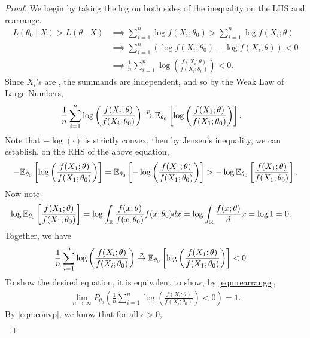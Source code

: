 \begin{proof}
We begin by taking the log on both sides of the inequality on the LHS and rearrange. 
\begin{align}
L(\theta_0 \mid X) > L(\theta \mid X) &\implies \sum_{i=1}^n \log f(X_i;\theta_0) > \sum_{i=1}^n \log f(X_i;\theta)\nonumber\\
&\implies \sum_{i=1}^n \left(\log f(X_i;\theta_0) - \log f(X_i;\theta)\right) < 0\nonumber \\
&\implies \frac{1}{n}\sum_{i=1}^n\log\left( \frac{f(X_i;\theta)}{f(X_i;\theta_0)} \right) < 0. \label{eqn:rearrange}
\end{align}
Since $X_i$'s are \iid, the summands are independent, and so by the Weak Law of Large Numbers,
\begin{align*}
\frac{1}{n}\sum_{i=1}^n\log\left( \frac{f(X_i;\theta)}{f(X_i;\theta_0)} \right) &\overset{p}{\rightarrow} \mathbb{E}_{\theta_0}\left[ \log \left( \frac{f(X_1; \theta)}{f(X_1; \theta_0)} \right) \right].
\end{align*}
Note that $-\log(\cdot)$ is strictly convex, then by Jensen's inequality, we can establish, on the RHS of the above equation,
\begin{align*}
-\mathbb{E}_{\theta_0}\left[ \log \left( \frac{f(X_1; \theta)}{f(X_1; \theta_0)} \right) \right] = \mathbb{E}_{\theta_0}\left[ -\log \left( \frac{f(X_1; \theta)}{f(X_1; \theta_0)} \right) \right] > -\log \mathbb{E}_{\theta_0}\left[ \frac{f(X_1; \theta)}{f(X_1; \theta_0)}  \right].
\end{align*}
Now note
\begin{align*}
\log \mathbb{E}_{\theta_0} \left[ \frac{f(X_1; \theta)}{f(X_1; \theta_0)} \right] &= \log \int_{\mathbb{R}} \frac{f(x; \theta)}{f(x; \theta_0)} f(x; \theta_0) dx = \log\int_{\mathbb{R}} \frac{f(x; \theta)} dx = \log 1 = 0.
\end{align*}
Together, we have
\begin{align}
\frac{1}{n}\sum_{i=1}^n\log\left( \frac{f(X_i;\theta)}{f(X_i;\theta_0)} \right) &\overset{p}{\rightarrow} \mathbb{E}_{\theta_0}\left[ \log \left( \frac{f(X_1; \theta)}{f(X_1; \theta_0)} \right) \right] < 0. \label{eqn:convp}
\end{align}
To show the desired equation, it is equivalent to show, by \cref{eqn:rearrange},
\begin{align*}
\lim_{n\to\infty}P_{\theta_0}\left( \frac{1}{n}\sum_{i=1}^n\log\left( \frac{f(X_i;\theta)}{f(X_i;\theta_0)} \right) < 0 \right) = 1.
\end{align*}
By \cref{eqn:convp}, we know that for all $\epsilon > 0$,
\begin{align*}

\end{align*}
\end{proof}
